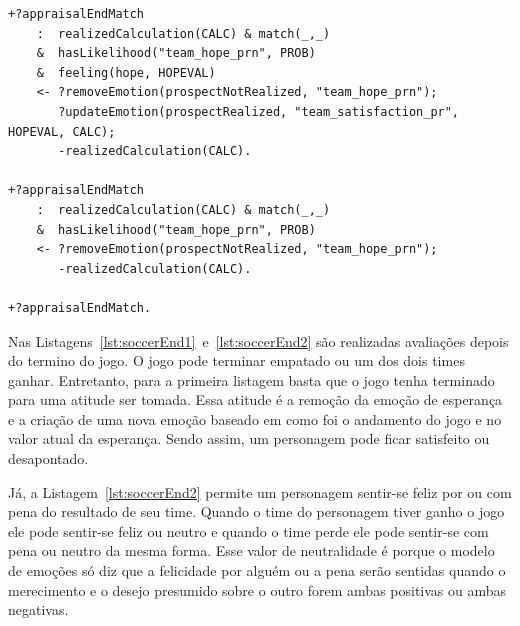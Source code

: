 \begin{center}
    \begin{minipage}{140mm}
	\lstset{linewidth=140mm}
	\begin{lstlisting}[frame=trbl,
caption=Parte do código do agente referente à avaliação do final do jogo para
as emoções de probabilidade,
label=lst:soccerEnd1]
+?appraisalEndMatch
    :  realizedCalculation(CALC) & match(_,_)
    &  hasLikelihood("team_hope_prn", PROB)
    &  feeling(hope, HOPEVAL)
    <- ?removeEmotion(prospectNotRealized, "team_hope_prn");
       ?updateEmotion(prospectRealized, "team_satisfaction_pr", HOPEVAL, CALC);
       -realizedCalculation(CALC).

+?appraisalEndMatch
    :  realizedCalculation(CALC) & match(_,_)
    &  hasLikelihood("team_hope_prn", PROB)
    <- ?removeEmotion(prospectNotRealized, "team_hope_prn");
       -realizedCalculation(CALC).

+?appraisalEndMatch.
	\end{lstlisting}
    \end{minipage}
\end{center}

Nas Listagens~\ref{lst:soccerEnd1}~e~\ref{lst:soccerEnd2} são realizadas
avaliações depois do termino do jogo. O jogo pode terminar empatado ou um dos
dois times ganhar. Entretanto, para a primeira listagem basta que o jogo tenha
terminado para uma atitude ser tomada. Essa atitude é a remoção da emoção de
esperança e a criação de uma nova emoção baseado em como foi o andamento do
jogo e no valor atual da esperança. Sendo assim, um personagem pode ficar
satisfeito ou desapontado.

Já, a Listagem~\ref{lst:soccerEnd2} permite um personagem sentir-se feliz
por ou com pena do resultado de seu time. Quando o time do personagem
tiver ganho o jogo ele pode sentir-se feliz ou neutro e quando o time perde
ele pode sentir-se com pena ou neutro da mesma forma. Esse valor de
neutralidade é porque o modelo de emoções só diz que a felicidade por alguém
ou a pena serão sentidas quando o merecimento e o desejo presumido sobre o
outro forem ambas positivas ou ambas negativas.

